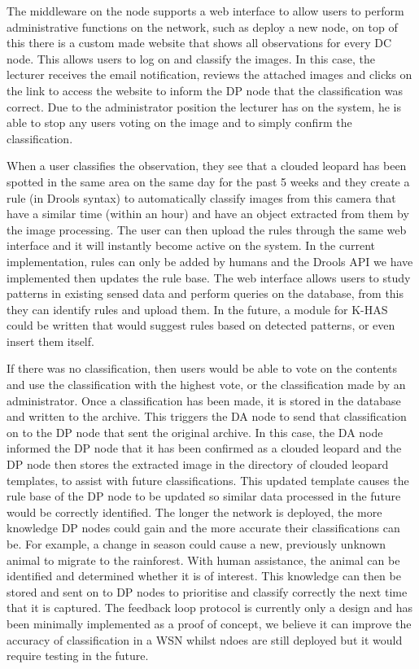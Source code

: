 			The middleware on the node supports a web interface to allow users to perform administrative functions on the network, such as deploy a new node, on top of this there is a custom made website that shows all observations for every DC node. This allows users to log on and classify the images. In this case, the lecturer receives the email notification, reviews the attached images and clicks on the link to access the website to inform the DP node that the classification was correct. Due to the administrator position the lecturer has on the system, he is able to stop any users voting on the image and to simply confirm the classification.
			
			When a user classifies the observation, they see that a clouded leopard has been spotted in the same area on the same day for the past 5 weeks and they create a rule (in Drools syntax) to automatically classify images from this camera that have a similar time (within an hour) and have an object extracted from them by the image processing. The user can then upload the rules through the same web interface and it will instantly become active on the system. In the current implementation, rules can only be added by humans and the Drools API we have implemented then updates the rule base. The web interface allows users to study patterns in existing sensed data and perform queries on the database, from this they can identify rules and upload them. In the future, a module for K-HAS could be written that would suggest rules based on detected patterns, or even insert them itself.

			If there was no classification, then users would be able to vote on the contents and use the classification with the highest vote, or the classification made by an administrator. Once a classification has been made, it is stored in the database and written to the archive. This triggers the DA node to send that classification on to the DP node that sent the original archive. In this case, the DA node informed the DP node that it has been confirmed as a clouded leopard and the DP node then stores the extracted image in the directory of clouded leopard templates, to assist with future classifications. This updated template causes the rule base of the DP node to be updated so similar data processed in the future would be correctly identified. The longer the network is deployed, the more knowledge DP nodes could gain and the more accurate their classifications can be. For example, a change in season could cause a new, previously unknown animal to migrate to the rainforest. With human assistance, the animal can be identified and determined whether it is of interest. This knowledge can then be stored and sent on to DP nodes to prioritise and classify correctly the next time that it is captured. The feedback loop protocol is currently only a design and has been minimally implemented as a proof of concept, we believe it can improve the accuracy of classification in a WSN whilst ndoes are still deployed but it would require testing in the future.
					
